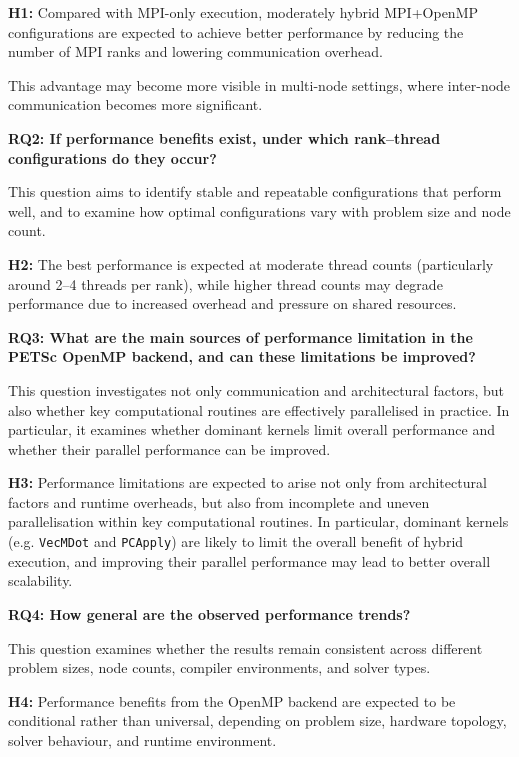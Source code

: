 \documentclass{article}
\begin{document}
\textbf{H1:} Compared with MPI-only execution, moderately hybrid MPI+OpenMP configurations are expected to achieve better performance by reducing the number of MPI ranks and lowering communication overhead.

This advantage may become more visible in multi-node settings, where inter-node communication becomes more significant.
\vspace{0.8em}

\noindent\textbf{RQ2: If performance benefits exist, under which rank--thread configurations do they occur?}

This question aims to identify stable and repeatable configurations that perform well, and to examine how optimal configurations vary with problem size and node count.

\textbf{H2:} The best performance is expected at moderate thread counts (particularly around 2--4 threads per rank), while higher thread counts may degrade performance due to increased overhead and pressure on shared resources.
\vspace{0.8em}

\noindent\textbf{RQ3: What are the main sources of performance limitation in the PETSc OpenMP backend, and can these limitations be improved?}

This question investigates not only communication and architectural factors, but also whether key computational routines are effectively parallelised in practice. In particular, it examines whether dominant kernels limit overall performance and whether their parallel performance can be improved.

\textbf{H3:} Performance limitations are expected to arise not only from architectural factors and runtime overheads, but also from incomplete and uneven parallelisation within key computational routines. In particular, dominant kernels (e.g. \texttt{VecMDot} and \texttt{PCApply}) are likely to limit the overall benefit of hybrid execution, and improving their parallel performance may lead to better overall scalability.
\vspace{0.8em}

\noindent\textbf{RQ4: How general are the observed performance trends?}

This question examines whether the results remain consistent across different problem sizes, node counts, compiler environments, and solver types.

\textbf{H4:} Performance benefits from the OpenMP backend are expected to be conditional rather than universal, depending on problem size, hardware topology, solver behaviour, and runtime environment.
\end{document}
